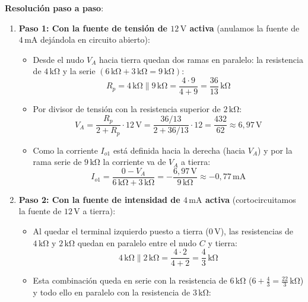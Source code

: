 \begin{ejercicio}
\textbf{Resolución paso a paso}:
\begin{enumerate}
    \item \textbf{Paso 1: Con la fuente de tensión de $12\,\si{\volt}$ activa} (anulamos la fuente de $4\,\si{\milli\ampere}$ dejándola en circuito abierto):
    \begin{itemize}
        \item Desde el nudo $V_A$ hacia tierra quedan dos ramas en paralelo: la resistencia de $4\,\si{\kilo\ohm}$ y la serie $(6\,\si{\kilo\ohm} + 3\,\si{\kilo\ohm} = 9\,\si{\kilo\ohm})$:
        \begin{equation*}
            R_p = 4\,\si{\kilo\ohm} \parallel 9\,\si{\kilo\ohm} = \frac{4\cdot 9}{4 + 9} = \frac{36}{13}\,\si{\kilo\ohm}
        \end{equation*}
        \item Por divisor de tensión con la resistencia superior de $2\,\si{\kilo\ohm}$:
        \begin{equation*}
            V_A = \frac{R_p}{2 + R_p}\cdot 12\,\si{\volt} = \frac{36/13}{2 + 36/13}\cdot 12 = \frac{432}{62} \approx 6{,}97\,\si{\volt}
        \end{equation*}
        \item Como la corriente $I_{o1}$ está definida hacia la derecha (hacia $V_A$) y por la rama serie de $9\,\si{\kilo\ohm}$ la corriente va de $V_A$ a tierra:
        \begin{equation*}
            I_{o1} = \frac{0 - V_A}{6\,\si{\kilo\ohm} + 3\,\si{\kilo\ohm}} = -\frac{6{,}97\,\si{\volt}}{9\,\si{\kilo\ohm}} \approx -0{,}77\,\si{\milli\ampere}
        \end{equation*}
    \end{itemize}
    \item \textbf{Paso 2: Con la fuente de intensidad de $4\,\si{\milli\ampere}$ activa} (cortocircuitamos la fuente de $12\,\si{\volt}$ a tierra):
    \begin{itemize}
        \item Al quedar el terminal izquierdo puesto a tierra ($0\,\si{\volt}$), las resistencias de $4\,\si{\kilo\ohm}$ y $2\,\si{\kilo\ohm}$ quedan en paralelo entre el nudo $C$ y tierra:
        \begin{equation*}
            4\,\si{\kilo\ohm} \parallel 2\,\si{\kilo\ohm} = \frac{4\cdot 2}{4 + 2} = \frac{4}{3}\,\si{\kilo\ohm}
        \end{equation*}
        \item Esta combinación queda en serie con la resistencia de $6\,\si{\kilo\ohm}$ ($6 + \frac{4}{3} = \frac{22}{3}\,\si{\kilo\ohm}$) y todo ello en paralelo con la resistencia de $3\,\si{\kilo\ohm}$:

\end{itemize}
\end{enumerate}
\end{ejercicio}
